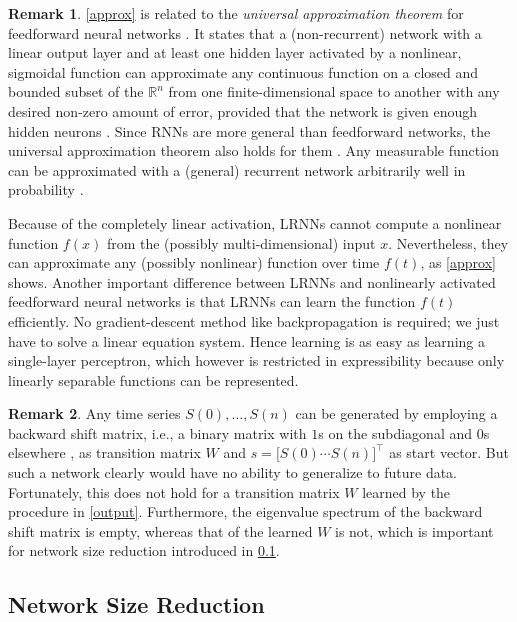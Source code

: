 \documentclass[twoside,11pt]{article}
\theoremstyle{definition}
\newtheorem{remk}{Remark}
\begin{document}
\begin{remk}
\cref{approx} is related to the \emph{universal approximation theorem} for
feedforward neural networks \citep{Hor91}. It states that a (non-recurrent)
network with a linear output layer and at least one hidden layer activated by a
nonlinear, sigmoidal function can approximate any continuous function on a
closed and bounded subset of the $\mathbb{R}^n$ from one finite-dimensional
space to another with any desired non-zero amount of error, provided that the
network is given enough hidden neurons \citep[Sect.~6.4.1]{GBC16}. Since RNNs
are more general than feedforward networks, the universal approximation theorem
also holds for them \citep{MNM02}. Any measurable function can be
approximated with a (general) recurrent network arbitrarily well in probability
\citep{Ham00}.

Because of the completely linear activation, LRNNs cannot compute a nonlinear
function $f(x)$ from the (possibly multi-dimensional) input $x$. Nevertheless,
they can approximate any (possibly nonlinear) function over time $f(t)$, as
\cref{approx} shows. Another important difference between LRNNs and
nonlinearly activated feedforward neural networks is that LRNNs can learn
the function $f(t)$ efficiently. No gradient-descent method like backpropagation is
required; we just have to solve a linear equation system. Hence learning is as
easy as learning a single-layer perceptron, which however is restricted in
expressibility because only linearly separable functions can be represented.
\end{remk}

\begin{remk}
Any time series $S(0),\dots,S(n)$ can be generated by employing a backward shift
matrix, i.e., a binary matrix with $1$s on the subdiagonal and $0$s elsewhere
\citep[Sect.~0.9.7]{HJ13}, as transition matrix $W$ and $s = \big[ S(0) \cdots
S(n) \big]^\top$ as start vector. But such a network clearly would have no
ability to generalize to future data. Fortunately, this does not hold for a
transition matrix $W$ learned by the procedure in \cref{output}. Furthermore,
the eigenvalue spectrum of the backward shift matrix is empty, whereas that of
the learned $W$ is not, which is important for network size reduction
introduced in \cref{reduce}.
\end{remk}

\subsection{Network Size Reduction}\label{reduce}
\end{document}
